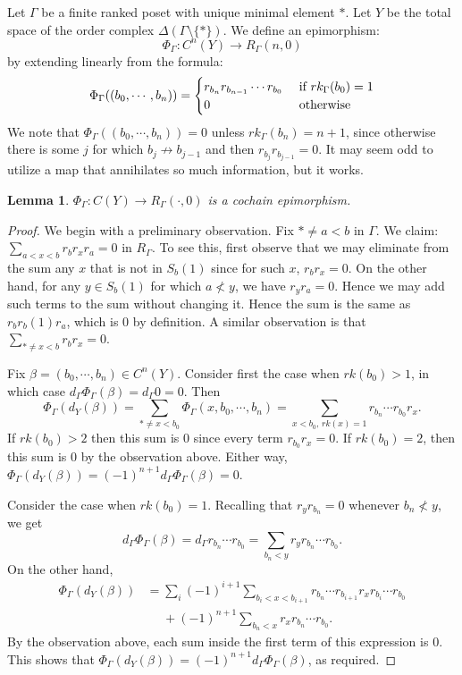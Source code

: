 \documentclass[11pt,righttag]{amsart}
\newtheorem{lemma}[thm]{Lemma}
\theoremstyle{definition}
\begin{document}
Let $\Gamma$ be a finite ranked poset with unique minimal element $*$.   
Let $Y$ be the total space of the order complex $\Delta(\Gamma\setminus\{*\})$.  We define an epimorphism:
$$\Phi_\Gamma: C^n(Y) \to R_\Gamma(n,0)$$
by extending linearly from the formula:
$$ \Phi_\Gamma((b_0,\cdots,b_n)) = \begin{cases}
		r_{b_n}r_{b_{n-1}}\cdots r_{b_0} & \hbox{ if\ } rk_\Gamma(b_0)=1 \\
		0 & \hbox{\ otherwise\ } \\
\end{cases}
$$
We note that $\Phi_\Gamma((b_0,\cdots,b_n)) = 0$ unless $rk_\Gamma(b_n)= n+1$, since otherwise there is some $j$ for which $b_j \not\to b_{j-1}$ and then $r_{b_j}r_{b_{j-1}} =0$.  It may seem odd to utilize a map that annihilates so much information, but it works.

\begin{lemma}  $\Phi_\Gamma: C(Y) \to R_\Gamma(\cdot,0)$ is a cochain epimorphism.
\end{lemma}

\begin{proof}  We begin with a preliminary observation.  Fix $*\ne a<b$ in $\Gamma$.  We claim: 
$\sum\limits_{a<x<b} r_br_xr_a = 0$ in $R_\Gamma$.  To see this, first observe that we may eliminate from the sum any $x$ that is not in $S_b(1)$ since for such $x$, $r_br_x=0$.  On the other hand, for any $y\in S_b(1)$ for which $a\not<y$, we have $r_yr_a = 0$.  Hence we may add such terms to the sum without changing it.  Hence the sum is the same as $r_b r_b(1) r_a$, which is $0$ by definition.   A similar observation is that $\sum\limits_{*\ne x<b} r_b r_x = 0$.  

Fix $\beta=(b_0,\cdots,b_n)\in C^n(Y)$. Consider first the case when $rk(b_0)>1$, in which case $d_\Gamma \Phi_\Gamma(\beta) = d_\Gamma 0 = 0$.  Then 
$$ \Phi_\Gamma(d_Y(\beta)) =  \sum\limits_{*\ne x<b_0} \Phi_\Gamma(x,b_0,\cdots, b_n) = \sum_{x<b_0,\, rk(x)=1} r_{b_n}\cdots r_{b_0} r_x.$$
If $rk(b_0) >2$ then this sum is $0$ since every term $r_{b_0} r_x = 0$.  If $rk(b_0) = 2$, then this sum is $0$ by the observation above.  Either way, $\Phi_\Gamma(d_Y(\beta)) = (-1)^{n+1} d_\Gamma \Phi_\Gamma(\beta) = 0$.

Consider the case when $rk(b_0) = 1$.  Recalling that $r_yr_{b_n} = 0$ whenever $b_n\not<y$, we get
$$d_\Gamma \Phi_\Gamma(\beta) = d_\Gamma r_{b_n}\cdots r_{b_0} = \sum\limits_{b_n<y} r_yr_{b_n}\cdots r_{b_0}.$$
On the other hand,
\begin{align*}
\Phi_\Gamma(d_Y(\beta)) &=  \sum_i (-1)^{i+1}\sum\limits_{b_i< x<b_{i+1}}  r_{b_n}\cdots r_{b_{i+1}}r_xr_{b_i}\cdots r_{b_0}\\
		&\ \ \ \ \ \ + (-1)^{n+1}\sum\limits_{b_n<x} r_xr_{b_n}\cdots r_{b_0}.
\end{align*}
By the observation above, each sum inside the first term of this expression is $0$.  This shows that $\Phi_\Gamma(d_Y(\beta)) = (-1)^{n+1} d_\Gamma \Phi_\Gamma(\beta)$, as required.
\end{proof}
\end{document}
